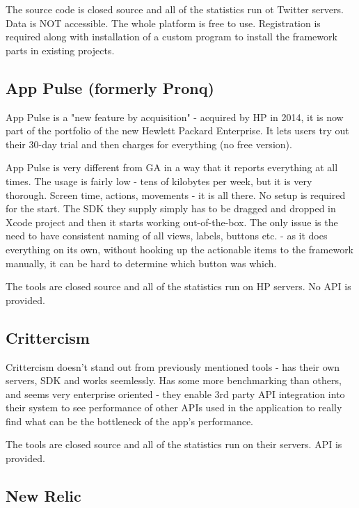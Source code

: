 The source code is closed source and all of the statistics run ot Twitter servers. Data is NOT accessible. The whole platform is free to use. Registration is required along with installation of a custom program to install the framework parts in existing projects.


\subsection{App Pulse (formerly Pronq)}

App Pulse is a "new feature by acquisition" - acquired by HP in 2014, it is now part of the portfolio of the new Hewlett Packard Enterprise. It lets users try out their 30-day trial and then charges for everything (no free version).

App Pulse is very different from GA in a way that it reports everything at all times. The usage is fairly low - tens of kilobytes per week, but it is very thorough. Screen time, actions, movements - it is all there. No setup is required for the start. The SDK they supply simply has to be dragged and dropped in Xcode project and then it starts working out-of-the-box. The only issue is the need to have consistent naming of all views, labels, buttons etc. - as it does everything on its own, without hooking up the actionable items to the framework manually, it can be hard to determine which button was which.

The tools are closed source and all of the statistics run on HP servers. No API is provided.


\subsection{Crittercism}

Crittercism doesn't stand out from previously mentioned tools - has their own servers, SDK and works seemlessly. Has some more benchmarking than others, and seems very enterprise oriented - they enable 3rd party API integration into their system to see performance of other APIs used in the application to really find what can be the bottleneck of the app's performance.

The tools are closed source and all of the statistics run on their servers. API is provided.


\subsection{New Relic}


